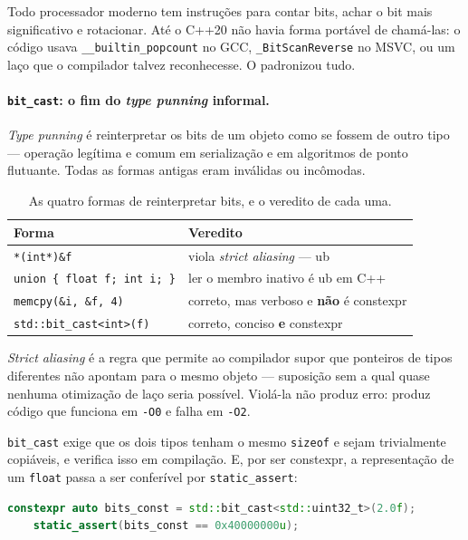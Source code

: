 Todo processador moderno tem instruções para contar bits, achar o bit mais
significativo e rotacionar. Até o C++20 não havia forma portável de chamá-las:
o código usava \texttt{\_\_builtin\_popcount} no GCC,
\texttt{\_BitScanReverse} no MSVC, ou um laço que o compilador talvez
reconhecesse. O  padronizou tudo.

\paragraph{\texttt{bit\_cast}: o fim do \emph{type punning} informal.}
\emph{Type punning} é reinterpretar os bits de um objeto como se fossem de outro
tipo --- operação legítima e comum em serialização e em algoritmos de ponto
flutuante. Todas as formas antigas eram inválidas ou incômodas.

\begin{table}[htbp]
\centering
\caption{As quatro formas de reinterpretar bits, e o veredito de cada uma.}
\label{tab:type-punning}
\footnotesize
\begin{tabular}{@{}ll@{}}
\toprule
\textbf{Forma} & \textbf{Veredito} \\
\midrule
\texttt{*(int*)\&f}                & viola \emph{strict aliasing} --- \gls{ub} \\
\texttt{union \{ float f; int i; \}} & ler o membro inativo é \gls{ub} em C++ \\
\texttt{memcpy(\&i, \&f, 4)}       & correto, mas verboso e \textbf{não} é \gls{constexpr} \\
\texttt{std::bit\_cast<int>(f)}    & correto, conciso \textbf{e} \gls{constexpr} \\
\bottomrule
\end{tabular}
\end{table}

\emph{Strict aliasing} é a regra que permite ao compilador supor que ponteiros
de tipos diferentes não apontam para o mesmo objeto --- suposição sem a qual
quase nenhuma otimização de laço seria possível. Violá-la não produz erro:
produz código que funciona em \texttt{-O0} e falha em \texttt{-O2}.

\texttt{bit\_cast} exige que os dois tipos tenham o mesmo \texttt{sizeof} e
sejam trivialmente copiáveis, e verifica isso em compilação. E, por ser
\gls{constexpr}, a representação de um \texttt{float} passa a ser conferível por
\texttt{static\_assert}:

\begin{lstlisting}[style=bt, language=C++,
    caption={Transcrição de \texttt{src/bits/demo\_bit.hpp}: a representação
             conferida em compilação.}]
    constexpr auto bits_const = std::bit_cast<std::uint32_t>(2.0f);
    static_assert(bits_const == 0x40000000u);
\end{lstlisting}

